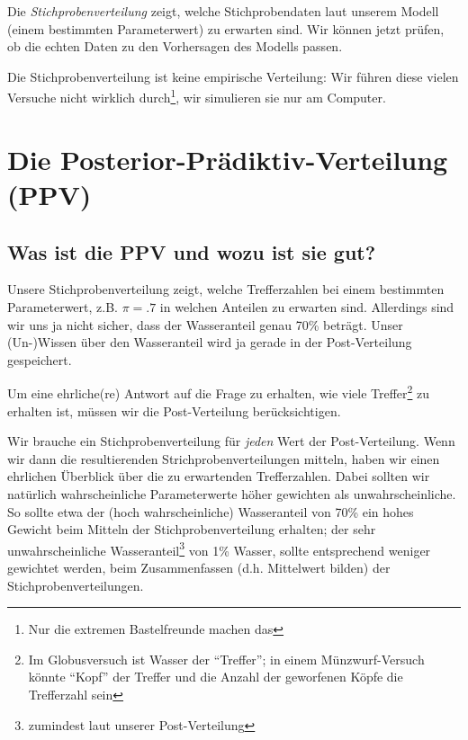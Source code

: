 \documentclass[
  a4paper,
  DIV=11]{scrreprt}
\theoremstyle{definition}
\theoremstyle{remark}
\begin{document}
Die \emph{Stichprobenverteilung} zeigt, welche Stichprobendaten laut
unserem Modell (einem bestimmten Parameterwert) zu erwarten sind. Wir
können jetzt prüfen, ob die echten Daten zu den Vorhersagen des Modells
passen.

\begin{tcolorbox}[enhanced jigsaw, title=\textcolor{quarto-callout-note-color}{\faInfo}\hspace{0.5em}{Hinweis}, bottomtitle=1mm, bottomrule=.15mm, titlerule=0mm, colbacktitle=quarto-callout-note-color!10!white, colframe=quarto-callout-note-color-frame, leftrule=.75mm, left=2mm, toprule=.15mm, colback=white, arc=.35mm, breakable, toptitle=1mm, opacityback=0, rightrule=.15mm, coltitle=black, opacitybacktitle=0.6]

Die Stichprobenverteilung ist keine empirische Verteilung: Wir führen
diese vielen Versuche nicht wirklich durch\footnote{Nur die extremen
  Bastelfreunde machen das}, wir simulieren sie nur am Computer.

\end{tcolorbox}

\hypertarget{die-posterior-pruxe4diktiv-verteilung-ppv}{%
\section{Die Posterior-Prädiktiv-Verteilung
(PPV)}\label{die-posterior-pruxe4diktiv-verteilung-ppv}}

\hypertarget{was-ist-die-ppv-und-wozu-ist-sie-gut}{%
\subsection{Was ist die PPV und wozu ist sie
gut?}\label{was-ist-die-ppv-und-wozu-ist-sie-gut}}

Unsere Stichprobenverteilung zeigt, welche Trefferzahlen bei einem
bestimmten Parameterwert, z.B. \(\pi=.7\) in welchen Anteilen zu
erwarten sind. Allerdings sind wir uns ja nicht sicher, dass der
Wasseranteil genau 70\% beträgt. Unser (Un-)Wissen über den Wasseranteil
wird ja gerade in der Post-Verteilung gespeichert.

Um eine ehrliche(re) Antwort auf die Frage zu erhalten, wie viele
Treffer\footnote{Im Globusversuch ist Wasser der ``Treffer''; in einem
  Münzwurf-Versuch könnte ``Kopf'' der Treffer und die Anzahl der
  geworfenen Köpfe die Trefferzahl sein} zu erhalten ist, müssen wir die
Post-Verteilung berücksichtigen.

Wir brauche ein Stichprobenverteilung für \emph{jeden} Wert der
Post-Verteilung. Wenn wir dann die resultierenden
Strichprobenverteilungen mitteln, haben wir einen ehrlichen Überblick
über die zu erwartenden Trefferzahlen. Dabei sollten wir natürlich
wahrscheinliche Parameterwerte höher gewichten als unwahrscheinliche. So
sollte etwa der (hoch wahrscheinliche) Wasseranteil von 70\% ein hohes
Gewicht beim Mitteln der Stichprobenverteilung erhalten; der sehr
unwahrscheinliche Wasseranteil\footnote{zumindest laut unserer
  Post-Verteilung} von 1\% Wasser, sollte entsprechend weniger gewichtet
werden, beim Zusammenfassen (d.h. Mittelwert bilden) der
Stichprobenverteilungen.
\end{document}
